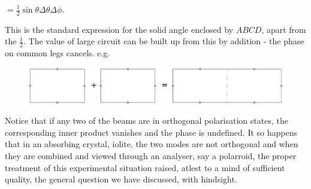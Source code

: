 $= \frac{1}{2} \sin \theta \Delta \theta \Delta \phi$.

This is the standard expression for the solid angle enclosed by $ABCD$, apart
from the $\frac{1}{2}$. The value of large circuit can be built up from this by addition -
the phase on common legs cancels. e.g.
\begin{figure}[H]
\centering
\includegraphics[scale=0.15]{src/images/chap26/13.eps}
\end{figure}

Notice that if any two of the beams are in orthogonal polarisation states, the
corresponding inner product vanishes and the phase is undefined. It so happens
that in an absorbing crystal, iolite, the two modes are not orthogonal and when
they are combined and viewed through an analyser, say a polarroid, the proper
treatment of this experimental situation raised, atlest to a mind of sufficient
quality, the general question we have discussed, with hindsight.

